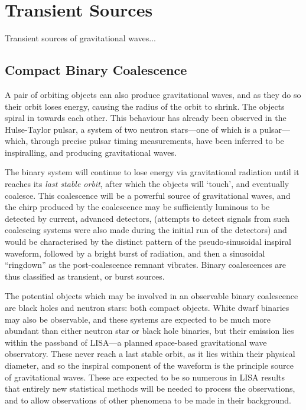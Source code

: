 \documentclass{kentigern}
\begin{document}
\section{Transient Sources}
\label{sec:transient-sources}

Transient sources of gravitational waves...

\subsection{Compact Binary Coalescence}
\label{sec:cbc}

A pair of orbiting objects can also produce gravitational waves, and
as they do so their orbit loses energy, causing the radius of the
orbit to shrink. The objects spiral in towards each other. This
behaviour has already been observed in the Hulse-Taylor
pulsar\cite{1975ApJ...195L..51H}\cite{2005ASPC..328...25W}, a system
of two neutron stars---one of which is a pulsar--- which, through
precise pulsar timing measurements, have been inferred to be
inspiralling, and producing gravitational waves.

The binary system will continue to lose energy via gravitational
radiation until it reaches its \emph{last stable orbit}, after which
the objects will `touch', and eventually coalesce. This coalescence
will be a powerful source of gravitational waves, and the chirp
produced by the coalescence may be sufficiently luminous to be
detected by current, advanced detectors, (attempts to detect signals
from such coalescing systems were also made during the initial run of
the detectors\cite{2012PhRvD..85h2002A}) and would be characterised by
the distinct pattern of the pseudo-sinusoidal inspiral waveform,
followed by a bright burst of radiation, and then a sinusoidal
``ringdown'' as the post-coalescence remnant
vibrates\cite{2009LRR....12....2S}. Binary coalescences are thus
classified as transient, or burst sources.

The potential objects which may be involved in an observable binary
coalescence are black holes and neutron stars: both compact
objects. White dwarf binaries may also be observable, and these
systems are expected to be much more abundant than either neutron star
or black hole binaries, but their emission lies within the passband of
LISA---a planned space-based gravitational wave observatory. These
never reach a last stable orbit, as it lies within their physical
diameter, and so the inspiral component of the waveform is the
principle source of gravitational waves. These are expected to be so
numerous in LISA results\cite{2013GWN.....6....4A} that entirely new statistical methods will be
needed to process the observations, and to allow observations of other
phenomena to be made in their background.
\end{document}
